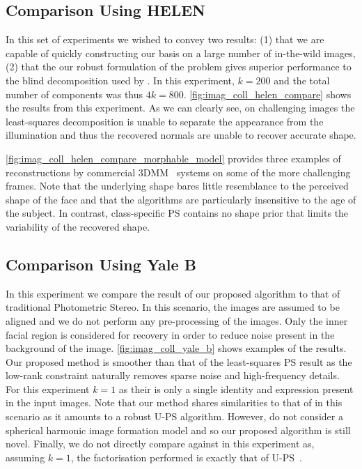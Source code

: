 \subsection{Comparison Using HELEN}\label{subsec:imag_coll_experiments_helen}
In this set of experiments we wished to convey two results: (1) that we are
capable of quickly constructing our basis on a large number of in-the-wild
images, (2) that the our robust formulation of the problem gives superior
performance to the blind decomposition used by \citet{KemelmacherShlizerman:2013iv}. 
In this experiment, $k = 200$ and the total number of components was thus $4k = 800$.
\cref{fig:imag_coll_helen_compare} shows the results from this experiment. As we can
clearly see, on challenging images the least-squares decomposition is unable to
separate the appearance from the illumination and thus the recovered normals are
unable to recover accurate shape.

\cref{fig:imag_coll_helen_compare_morphable_model} provides three examples
of reconstructions by commercial 3DMM~\cite{volker1999morphable} systems on
some of the more challenging frames. Note that the underlying shape bares little
resemblance to the perceived shape of the face and that the algorithms are
particularly insensitive to the age of the subject. In contrast, class-specific
PS contains no shape prior that limits the variability of the recovered shape.
\subsection{Comparison Using Yale B}\label{subsec:imag_coll_experiments_yaleb}
In this experiment we compare the result of our proposed algorithm to 
that of traditional Photometric Stereo. In this scenario, the images are assumed
to be aligned and we do not perform any pre-processing of the images. Only the
inner facial region is considered for recovery in order to reduce noise present
in the background of the image. \cref{fig:imag_coll_yale_b} shows examples
of the results. Our proposed method is smoother than that of the least-squares
PS result as the low-rank constraint naturally removes sparse noise and
high-frequency details. For this experiment $k = 1$ as their is only a single
identity and expression present in the input images. Note that our method
shares similarities to that of \citet{wu2010robust} in this scenario as it
amounts to a robust U-PS algorithm. However, \citet{wu2010robust} do not consider
a spherical harmonic image formation model and so our proposed algorithm is
still novel. Finally, we do not directly compare against
\citet{KemelmacherShlizerman:2013iv} in this experiment as, assuming $k = 1$,
the factorisation performed is exactly that of U-PS~\cite{basri2007photometric}.
